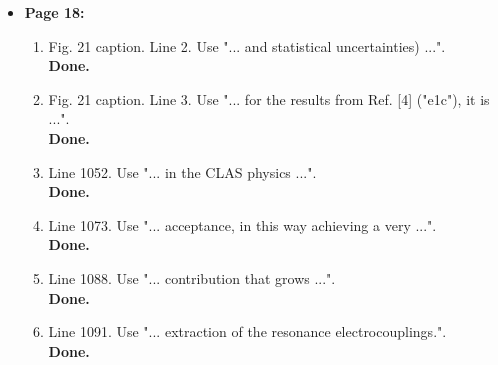 \documentclass[,superscriptaddress,showpacs,amssymb,amsmath,amsfonts,linenumbers,article]{revtex4-1}
\begin{document}
\begin{itemize}
\begin{enumerate}
\end{enumerate}  


\item {\bf \large  Page 18:}
\begin{enumerate}

\item Fig. 21 caption. Line 2. Use "... and statistical uncertainties) ...".\\
{\bf Done.}
\item Fig. 21 caption. Line 3. Use "... for the results from Ref. [4] ("e1c"), it is ...".\\
{\bf Done.}
\item Line 1052. Use "... in the CLAS physics ...".\\
{\bf Done.}
\item Line 1073. Use "... acceptance, in this way achieving a very ...".\\
{\bf Done.}
\item Line 1088. Use "... contribution that grows ...".\\
{\bf Done.}
\item Line 1091. Use "... extraction of the resonance electrocouplings.".\\
{\bf Done.}

\end{enumerate}  



\end{itemize}
\end{document}
